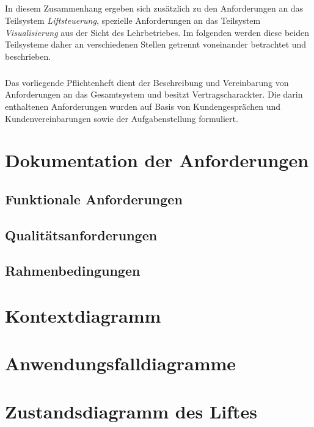\paragraph{}
In diesem Zusammenhang ergeben sich zusätzlich zu den Anforderungen an das Teilsystem \textit{Liftsteuerung}, spezielle Anforderungen an das Teilsystem \textit{Visualisierung} aus der Sicht des Lehrbetriebes. Im folgenden werden diese beiden Teilsysteme daher an verschiedenen Stellen getrennt voneinander betrachtet und beschrieben.

\paragraph{}
Das vorliegende Pflichtenheft dient der Beschreibung und Vereinbarung von Anforderungen an das Gesamtsystem und besitzt Vertragscharackter. Die darin enthaltenen Anforderungen wurden auf Basis von Kundengesprächen und Kundenvereinbarungen sowie der Aufgabenstellung formuliert. 

\chapter{Dokumentation der Anforderungen}

\section{Funktionale Anforderungen}

\section{Qualitätsanforderungen}

\section{Rahmenbedingungen}

\chapter{Kontextdiagramm}

\chapter{Anwendungsfalldiagramme}

\chapter{Zustandsdiagramm des Liftes}

